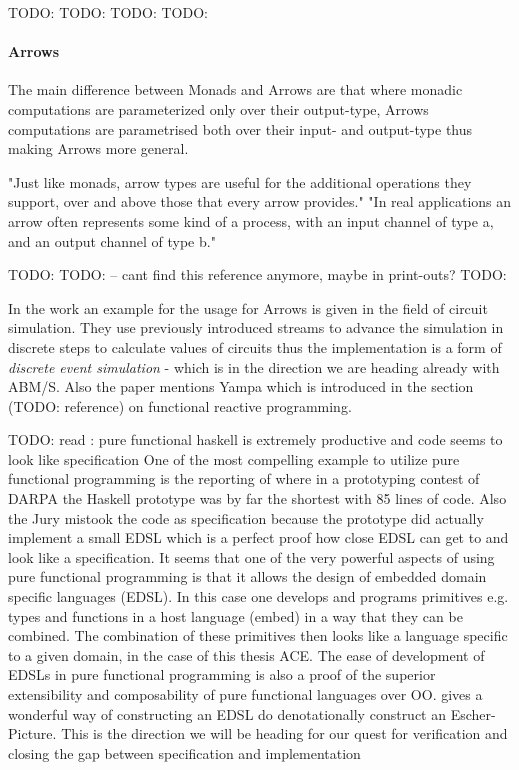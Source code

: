 TODO: \cite{moggi_computational_1989}
TODO: \cite{wadler_comprehending_1990}
TODO: \cite{wadler_monads_1995}
TODO: \cite{wadler_how_1997}

\paragraph{Arrows}
The main difference between Monads and Arrows are that where monadic computations are parameterized only over their output-type, Arrows computations are parametrised both over their input- and output-type thus making Arrows more general.

"Just like monads, arrow types are useful for the additional operations they support, over and above those that every arrow provides."
"In real applications an arrow often represents some kind of a process, with an input channel of type a, and an output channel of type b."

TODO: \cite{hughes_generalising_2000}
TODO: \cite{Hughes2004} -- cant find this reference anymore, maybe in print-outs?
TODO: \cite{hughes_programming_2005}

In the work \cite{Hughes2004} an example for the usage for Arrows is given in the field of circuit simulation. They use previously introduced streams to advance the simulation in discrete steps to calculate values of circuits thus the implementation is a form of \textit{discrete event simulation} - which is in the direction we are heading already with ABM/S. Also the paper mentions Yampa which is introduced in the section (TODO: reference) on functional reactive programming.


TODO: read \cite{hudak_haskell_1994}: pure functional haskell is extremely productive and code seems to look like specification 
One of the most compelling example to utilize pure functional programming is the reporting of \cite{hudak_haskell_1994} where in a prototyping contest of DARPA the Haskell prototype was by far the shortest with 85 lines of code. Also the Jury mistook the code as specification because the prototype did actually implement a small EDSL which is a perfect proof how close EDSL can get to and look like a specification.
It seems that one of the very powerful aspects of using pure functional programming is that it allows the design of embedded domain specific languages (EDSL). In this case one develops and programs primitives e.g. types and functions in a host language (embed) in a way that they can be combined. The combination of these primitives then looks like a language specific to a given domain, in the case of this thesis ACE. The ease of development of EDSLs in pure functional programming is also a proof of the superior extensibility and composability of pure functional languages over OO. \cite{henderson_functional_1982} gives a wonderful way of constructing an EDSL do denotationally construct an Escher-Picture. This is the direction we will be heading for our quest for verification and closing the gap between specification and implementation
 
